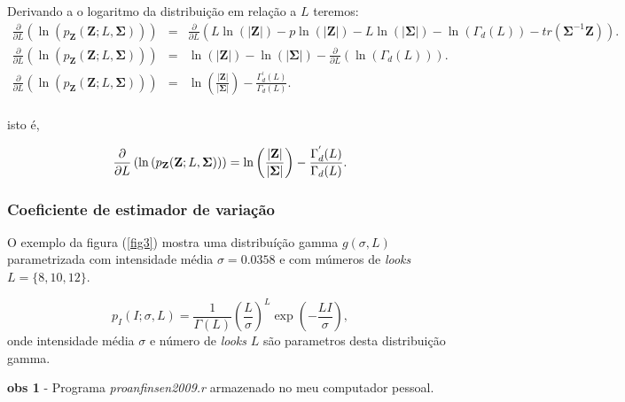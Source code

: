 \documentclass[12pt,a4paper]{article}
\begin{document}
Derivando a o logaritmo da distribuição em relação a $L$ teremos:
\begin{equation}\label{eqn96}
\begin{array}{ccc}
	\frac{\partial}{\partial L}\left(\ln{\left(p_{\mathbf{Z}}(\mathbf{Z};L,\mathbf{\Sigma})\right)}\right)&=&\frac{\partial}{\partial L}\left(L\ln{\left(|\mathbf{Z}|\right)}-p\ln{\left(|\mathbf{Z}|\right)} - L\ln{\left(|\mathbf{\Sigma}|\right)}-\ln{\left(\Gamma_d(L)\right)}-tr(\mathbf{\Sigma}^{-1}\mathbf{Z})\right). \\
	\frac{\partial}{\partial L}\left(\ln{\left(p_{\mathbf{Z}}(\mathbf{Z};L,\mathbf{\Sigma})\right)}\right)&=&\ln{\left(|\mathbf{Z}|\right)} - \ln{\left(|\mathbf{\Sigma}|\right)}-\frac{\partial}{\partial L}\left(\ln{\left(\Gamma_d(L)\right)}\right). \\
	\frac{\partial}{\partial L}\left(\ln{\left(p_{\mathbf{Z}}(\mathbf{Z};L,\mathbf{\Sigma})\right)}\right)&=&\ln{\left(\frac{|\mathbf{Z}|}{|\mathbf{\Sigma}|}\right)} - \frac{\Gamma^{'}_d(L)}{\Gamma_d(L)}. \\
\end{array}
\end{equation}

isto é, 

\begin{equation}\label{eqn97}
	\frac{\partial}{\partial L}\left(\ln{\left(p_{\mathbf{Z}}(\mathbf{Z};L,\mathbf{\Sigma})\right)}\right)=\ln{\left(\frac{|\mathbf{Z}|}{|\mathbf{\Sigma}|}\right)} - \frac{\Gamma^{'}_d(L)}{\Gamma_d(L)}. \\
\end{equation}
\subsubsection{Coeficiente de estimador de variação}

 O exemplo da figura (\ref{fig3}) mostra uma distribuíção gamma $g(\sigma, L)$ parametrizada com intensidade média $\sigma=0.0358$ e com múmeros de {\it looks} $L=\{8,10,12\}$.

\begin{equation}\label{eqn98}
	p_{I}(I;\sigma,L)=\frac{1}{\Gamma(L)}\left(\frac{L}{\sigma}\right)^L \exp(-\frac{LI}{\sigma}), 
\end{equation}
onde intensidade média $\sigma$ e número de {\it looks} $L$ são parametros desta distribuição gamma.

{\bf obs 1} - Programa {\it proanfinsen2009.r} armazenado no meu computador pessoal.
\end{document}
